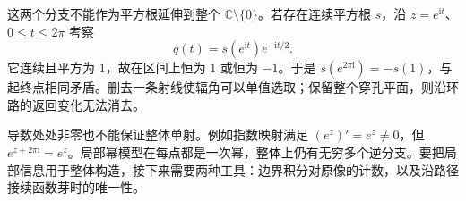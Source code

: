 这两个分支不能作为平方根延伸到整个 \(\mathbb C\setminus\{0\}\)。若存在连续平方根 \(s\)，沿 \(z=e^{\mathrm i t}\)、\(0\le t\le2\pi\) 考察
\[
	q(t)=s(e^{\mathrm i t})e^{-\mathrm i t/2}.
\]
它连续且平方为 \(1\)，故在区间上恒为 \(1\) 或恒为 \(-1\)。于是 \(s(e^{2\pi\mathrm i})=-s(1)\)，与起终点相同矛盾。删去一条射线使辐角可以单值选取；保留整个穿孔平面，则沿环路的返回变化无法消去。

\ProseParagraphBreak

导数处处非零也不能保证整体单射。例如指数映射满足 \((e^z)'=e^z\ne0\)，但 \(e^{z+2\pi\mathrm i}=e^z\)。局部幂模型在每点都是一次幂，整体上仍有无穷多个逆分支。要把局部信息用于整体构造，接下来需要两种工具：边界积分对原像的计数，以及沿路径接续函数芽时的唯一性。
